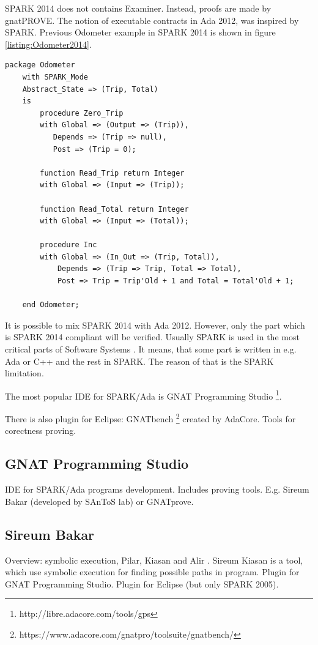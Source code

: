 SPARK 2014 does not contains Examiner. Instead, proofs are made by gnatPROVE.
The notion of executable contracts in Ada 2012, was inspired by SPARK. Previous Odometer example in SPARK 2014 is shown in figure \ref{listing:Odometer2014}.

\begin{lstlisting}[language=ada2012, frame=single, gobble=0, caption={SPARK 2014 code: Odometer}, label={listing:Odometer2014}]
	package Odometer
	with SPARK_Mode
	Abstract_State => (Trip, Total)
	is
		procedure Zero_Trip
		with Global => (Output => (Trip)),
		   Depends => (Trip => null),
		   Post => (Trip = 0);

		function Read_Trip return Integer
		with Global => (Input => (Trip));

		function Read_Total return Integer
		with Global => (Input => (Total));

		procedure Inc	   
		with Global => (In_Out => (Trip, Total)),
			Depends => (Trip => Trip, Total => Total),
			Post => Trip = Trip'Old + 1 and Total = Total'Old + 1;

	end Odometer;
\end{lstlisting} 

It is possible to mix SPARK 2014 with Ada 2012. However, only the part which is SPARK 2014 compliant will be verified. Usually SPARK is used in the most critical parts of Software Systems \cite{Spark:IndustrialExp}. It means, that some part is written in e.g. Ada or C++ and the rest in SPARK. The reason of that is the SPARK limitation.

The most popular IDE for SPARK/Ada is GNAT Programming Studio \footnote{http://libre.adacore.com/tools/gps}.

There is also plugin for Eclipse: GNATbench \footnote{https://www.adacore.com/gnatpro/toolsuite/gnatbench/} created by AdaCore. 
Tools for corectness proving.

\subsection{GNAT Programming Studio}
\label{background:spark:gps}
IDE for SPARK/Ada programs development. Includes proving tools. E.g. Sireum Bakar (developed by SAnToS lab) or GNATprove.


\subsection{Sireum Bakar}
\label{background:spark:sireum}
Overview: symbolic execution, Pilar, Kiasan and Alir \cite{Hari:Thesis}.
Sireum Kiasan \cite{Kiasan:Paper} is a tool, which use symbolic execution for finding possible paths in program.
Plugin for GNAT Programming Studio.
Plugin for Eclipse (but only SPARK 2005).


